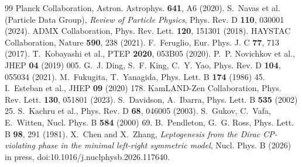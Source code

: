 \documentclass[12pt,a4paper]{article}
\numberwithin{equation}{section}
\begin{document}
\begin{thebibliography}{99}
 Planck Collaboration, Astron. Astrophys. \textbf{641}, A6 (2020).
 S.~Navas et al. (Particle Data Group), \emph{Review of Particle Physics}, Phys. Rev. D \textbf{110}, 030001 (2024).
 ADMX Collaboration, Phys. Rev. Lett. \textbf{120}, 151301 (2018).
 HAYSTAC Collaboration, Nature \textbf{590}, 238 (2021).
 F.~Feruglio, Eur. Phys. J. C \textbf{77}, 713 (2017).
 T.~Kobayashi et al., PTEP \textbf{2020}, 053B05 (2020).
 P.~P. Novichkov et al., JHEP \textbf{04} (2019) 005.
 G.~J. Ding, S.~F. King, C.~Y. Yao, Phys. Rev. D \textbf{104}, 055034 (2021).
 M.~Fukugita, T.~Yanagida, Phys. Lett. B \textbf{174} (1986) 45.
 I.~Esteban et al., JHEP \textbf{09} (2020) 178.
 KamLAND-Zen Collaboration, Phys. Rev. Lett. \textbf{130}, 051801 (2023).
 S.~Davidson, A.~Ibarra, Phys. Lett. B \textbf{535} (2002) 25.
 S.~Kachru et al., Phys. Rev. D \textbf{68}, 046005 (2003).
 S.~Gukov, C.~Vafa, E.~Witten, Nucl. Phys. B \textbf{584} (2000) 69.
 B.~Pendleton, G.~G. Ross, Phys. Lett. B \textbf{98}, 291 (1981).
 X.~Chen and X.~Zhang, \emph{Leptogenesis from the Dirac CP-violating phase in the minimal left-right symmetric model}, Nucl. Phys. B (2026) in press, doi:10.1016/j.nuclphysb.2026.117640.
\end{thebibliography}
\end{document}
